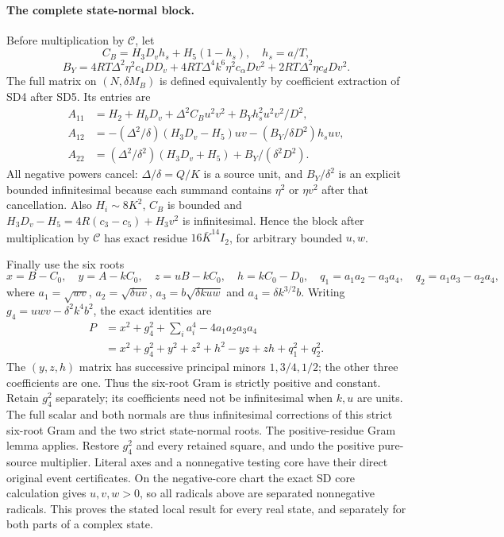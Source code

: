 \paragraph{The complete state-normal block.}
Before multiplication by $\mathcal C$, let
\[
 C_B=H_3D_vh_s+H_5(1-h_s),\quad h_s=a/T,
\]
\[
 B_Y=4RT\Delta^2\eta^2c_4DD_v
 +4RT\Delta^4k^6\eta^2c_\alpha Dv^2
 +2RT\Delta^2\eta c_dDv^2.
\]
The full matrix on $(N,\delta M_B)$ is defined equivalently by
coefficient extraction of SD4 after SD5. Its entries are
\[
\begin{split}
 A_{11}&=H_2+H_bD_v+\Delta^2C_Bu^2v^2
                                      +B_Yh_s^2u^2v^2/D^2,\\
 A_{12}&=-(\Delta^2/\delta)(H_3D_v-H_5)uv
                                      -(B_Y/\delta D^2)h_suv,\\
 A_{22}&=(\Delta^2/\delta^2)(H_3D_v+H_5)+B_Y/(\delta^2D^2).
\end{split}
\]
All negative powers cancel: $\Delta/\delta=Q/K$ is a source unit,
and $B_Y/\delta^2$ is an explicit bounded infinitesimal because each
summand contains $\eta^2$ or $\eta v^2$ after that cancellation.
Also $H_i\sim8K^2$, $C_B$ is bounded and
$H_3D_v-H_5=4R(c_3-c_5)+H_3v^2$ is infinitesimal.
Hence the block after multiplication by $\mathcal C$ has exact
residue $16\bar K^{14}I_2$, for arbitrary bounded $u,w$.

Finally use the six roots
\[
 x=B-C_0,\quad y=A-kC_0,\quad z=uB-kC_0,\quad
 h=kC_0-D_0,\quad q_1=a_1a_2-a_3a_4,\quad
 q_2=a_1a_3-a_2a_4,
\]
where $a_1=\sqrt{wv}$, $a_2=\sqrt{\delta uv}$,
$a_3=b\sqrt{\delta kuw}$ and $a_4=\delta k^{3/2}b$.
Writing $g_4=uwv-\delta^2k^4b^2$, the exact identities are
\[
\begin{split}
 P&=x^2+g_4^2+\sum_i a_i^4-4a_1a_2a_3a_4\\
  &=x^2+g_4^2+y^2+z^2+h^2-yz+zh+q_1^2+q_2^2.
\end{split}
\]
The $(y,z,h)$ matrix has successive principal minors
$1,3/4,1/2$; the other three coefficients are one.
Thus the six-root Gram is strictly positive and constant.
Retain $g_4^2$ separately; its coefficients
need not be infinitesimal when $k,u$ are units.
The full scalar and both normals are thus infinitesimal corrections
of this strict six-root Gram and the two strict state-normal roots.
The positive-residue Gram lemma applies. Restore $g_4^2$ and every
retained square, and undo the positive pure-source multiplier.
Literal axes and a nonnegative testing core have their direct original
event certificates. On the negative-core chart the exact SD core
calculation gives $u,v,w>0$, so all radicals above are separated
nonnegative radicals. This proves the stated local result for every
real state, and separately for both parts of a complex state.



